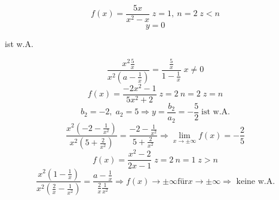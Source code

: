 \documentclass{book}
\begin{document}
\[f(x) = \frac{5x}{x^2-x} \; z=1, \ n=2 \; z < n\]
\[ y=0 \]
\begin{center} ist w.A.\end{center}
\[\frac{x^2\frac5x}{x^2(a-\frac1x)} = \frac{\frac5x}{1-\frac1x} \; x \not = 0\]
\[f(x) = \frac {-2x^2-1}{5x^2+2} \; z = 2\ n= 2\; z=n\]
\[b_2 = -2, \; a_2 = 5 \Rightarrow y = \frac {b_2}{a_2} = -\frac 52 \; \text{ist w.A.}\]
\[\frac{x^2(-2-\frac 1 {x^2})}{x^2(5+\frac2{x^2})} = \frac {-2-\frac 1{x^2}}{5+\frac2{x^2}} \Rightarrow\lim_{x\to\pm\infty}f(x) = -\frac 25\]
\[f(x) = \frac{x^2-2}{2x-1} \;z=2\ n=1\; z>n\]
\[\frac{x^2(1-\frac 1x)}{x^2(\frac 2x-\frac 1{x^2})} = \frac{a-\frac 1x}{\frac 2x \frac1{x^2}} \Rightarrow f(x) \to \pm \infty \text{für} x \to \pm \infty \Rightarrow \text{ keine w.A.}\]
\end{document}

